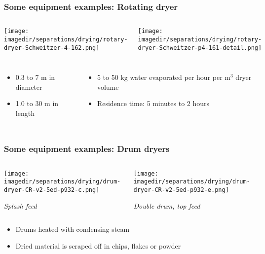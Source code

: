\begin{frame}\frametitle{Some equipment examples: Rotating dryer}
	\begin{columns}[t]
			\begin{center}
				\texttt{[image: \\imagedir/separations/drying/rotary-dryer-Schweitzer-4-162.png]}
			\end{center}
			\begin{center}
				\texttt{[image: \\imagedir/separations/drying/rotary-dryer-Schweitzer-p4-161-detail.png]}
			\end{center}
	\end{columns}

	\begin{columns}[t]
			\begin{itemize}
				\item	0.3 to 7 m in diameter
				\item	1.0 to 30 m in length
			\end{itemize}
			\begin{itemize}
				\item	5 to 50 kg water evaporated per hour per m$^3$ dryer volume
				\item	Residence time: 5 minutes to 2 hours
			\end{itemize}
			
	\end{columns}
\end{frame}

\begin{frame}\frametitle{Some equipment examples: Drum dryers}
	\begin{columns}[b]
			\begin{center}
				\texttt{[image: \\imagedir/separations/drying/drum-dryer-CR-v2-5ed-p932-c.png]}

				\vspace{12pt}
				\emph{Splash feed}
			\end{center}


			\begin{center}
				\texttt{[image: \\imagedir/separations/drying/drum-dryer-CR-v2-5ed-p932-e.png]}

				\vspace{12pt}
				\emph{Double drum, top feed}
			\end{center}
	\end{columns}
	\begin{itemize}
		\item	Drums heated with condensing steam
		\item	Dried material is scraped off in chips, flakes or powder
	\end{itemize}
\end{frame}

